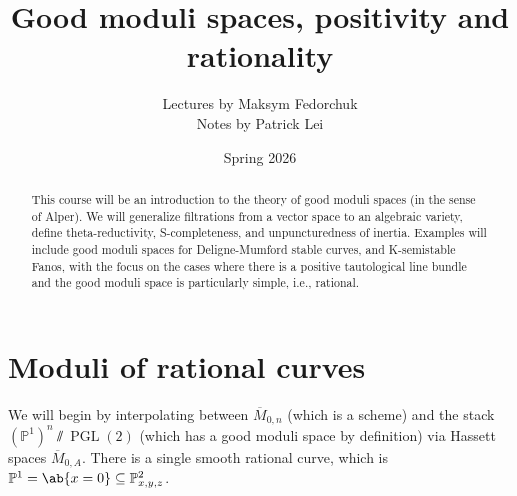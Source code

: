 \documentclass{amsart}
\title{Good moduli spaces, positivity and rationality}
\author{Lectures by Maksym Fedorchuk \\ Notes by Patrick Lei}
\date{Spring 2026}
\theoremstyle{definition}
\theoremstyle{remark}
\theoremstyle{plain}
\theoremstyle{definition}
\theoremstyle{remark}
\renewcommand{\P}{\mathbb{P}}
\newcommand{\on}[1]{\operatorname{#1}}
\newcommand{\ol}[1]{\overline{#1}}
\newcommand{\1}{\mathbf{1}}
\newcommand{\2}{\mathbf{2}}
\newcommand{\3}{\mathbf{3}}
\begin{document}
    
\begin{abstract}
    This course will be an introduction to the theory of good moduli
spaces (in the sense of Alper). We will generalize filtrations from a
vector space to an algebraic variety, define theta-reductivity,
S-completeness, and unpuncturedness of inertia. Examples will include
good moduli spaces for Deligne-Mumford stable curves, and K-semistable
Fanos, with the focus on the cases where there is a positive
tautological line bundle and the good moduli space is particularly
simple, i.e., rational.
\end{abstract}

\maketitle

\tableofcontents

\section{Moduli of rational curves}%
\label{sec:Moduli of rational curves}

We will begin by interpolating between \(\ol{M}_{0,n}\) (which is a scheme) and the stack \({(\P^1)}^n \sslash \on{PGL}(2)\) (which has a good moduli space by definition) via Hassett spaces \(\ol{M}_{0, A}\). There is a single smooth rational curve, which is \(\P^1 = \ab\{x = 0\} \subseteq \P^2_{x,y,z}\).
\end{document}

